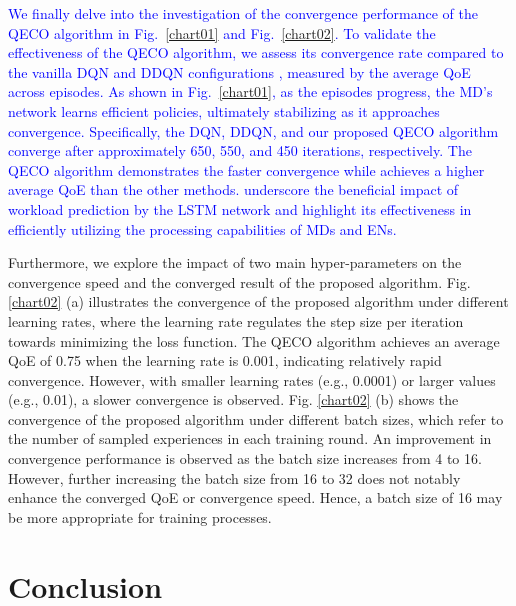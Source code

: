 \documentclass[10pt, journal,letterpaper]{IEEEtran}
\begin{document}
\vspace{5mm}

\textcolor{blue}{	
	We finally delve into the investigation of the convergence performance of the QECO algorithm in Fig.~\ref{chart01} and Fig.~\ref{chart02}. To validate the effectiveness of the QECO algorithm, we assess its convergence rate compared to the vanilla DQN and DDQN configurations \cite{van2016deep}, measured by the average QoE across episodes. As shown in Fig.~\ref{chart01}, as the episodes progress, the MD's network learns efficient policies, ultimately stabilizing as it approaches convergence. Specifically, the DQN, DDQN, and our proposed QECO algorithm converge after approximately 650, 550, and 450 iterations, respectively. 
The QECO algorithm demonstrates the faster convergence while achieves a higher average QoE than the other methods. underscore the beneficial impact of workload prediction by the LSTM network and highlight its effectiveness in efficiently utilizing the processing capabilities of  MDs and ENs.
}

Furthermore, we explore the impact of two main hyper-parameters on the convergence speed and the converged result of the proposed algorithm. Fig. \ref{chart02} (a) illustrates the convergence of the proposed algorithm under different learning rates, where the learning rate regulates the step size per iteration towards minimizing the loss function. The QECO algorithm achieves an average QoE of 0.75 when the learning rate is 0.001, indicating relatively rapid convergence. However, with smaller learning rates (e.g., 0.0001) or larger values (e.g., 0.01),  a slower convergence is observed. Fig. \ref{chart02} (b) shows the convergence of the proposed algorithm under different batch sizes, which refer to the number of sampled experiences in each training round. An improvement in convergence performance is observed as the batch size increases from 4 to 16. However, further increasing the batch size from 16 to 32 does not notably enhance the converged QoE or convergence speed. Hence, a batch size of 16 may be more appropriate for training processes.






\section{Conclusion}\label{section:VII}
\end{document}
